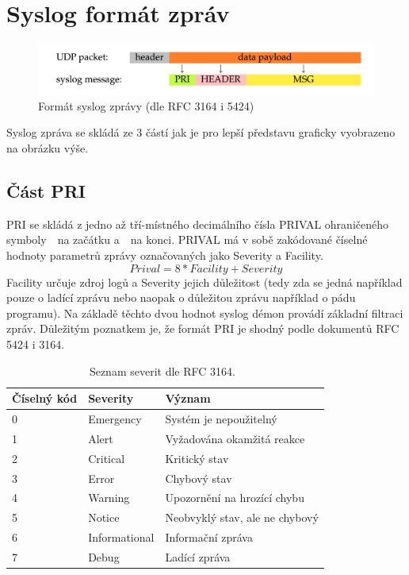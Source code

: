 \documentclass[thesis=B,czech]{FITthesis}[2012/06/26]
\begin{document}
\section{Syslog formát zpráv}
\begin{figure}[H]
	\centering
	\includegraphics[scale=0.3]{images/syslog-message-format}
	\caption[Formát syslog zprávy]{Formát syslog zprávy (dle RFC 3164 i 5424)}
\end{figure}

Syslog zpráva se skládá ze 3 částí jak je pro lepší představu graficky vyobrazeno na obrázku výše.

\subsection{Část PRI}
PRI se skládá z jedno až tří-místného decimálního čísla PRIVAL ohraničeného symboly~\uv{<}~na začátku a~\uv{>}~na konci.
PRIVAL má v sobě zakódované číselné hodnoty parametrů zprávy označovaných jako Severity a Facility.
$$Prival= 8*Facility+Severity$$
Facility určuje zdroj logů a Severity jejich důležitost (tedy zda se jedná například pouze o ladící zprávu nebo naopak o důležitou zprávu například o pádu programu). Na základě těchto dvou hodnot syslog démon provádí základní filtraci zpráv.
Důležitým poznatkem je, že formát PRI je shodný podle dokumentů RFC 5424 i 3164.

\begin{table}[ht]
\centering
	\caption[Tabulka severit podle RFC 3164]{Seznam severit dle RFC 3164.~\cite{RFC3164}}
	\begin{tabular}{|l|l|l|}\hline
		Číselný kód	& Severity & Význam	\tabularnewline \hline \hline
		0		& Emergency	&	Systém je nepoužitelný \tabularnewline \hline
		1		& Alert		&	Vyžadována okamžitá reakce \tabularnewline \hline
		2		& Critical	&	Kritický stav \tabularnewline \hline
		3		& Error		&	Chybový stav	\tabularnewline \hline
		4		& Warning	&	Upozornění na hrozící chybu \tabularnewline \hline
		5		& Notice		&	Neobvyklý stav, ale ne chybový \tabularnewline \hline
		6		& Informational & Informační zpráva \tabularnewline \hline
		7		& Debug		&	Ladící zpráva \tabularnewline \hline
	\end{tabular}
\end{table}
\end{document}
